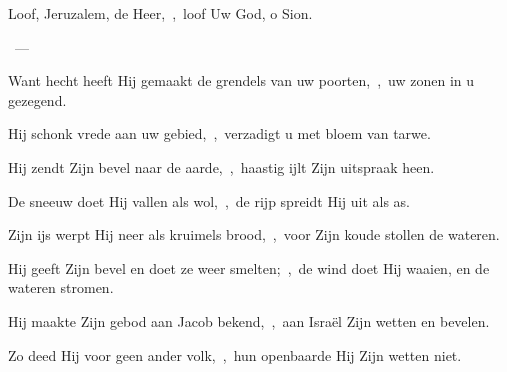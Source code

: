 \documentclass[12pt,twoside,a5paper]{article}
\begin{document}
\begin{halfparskip}
   
\end{halfparskip}

\begin{halfparskip}
   Loof, Jeruzalem, de Heer,~\sep\ loof Uw God, o Sion.

  ~--- 

  Want hecht heeft Hij gemaakt de grendels van uw poorten,~\sep\ uw zonen in u gezegend.

  Hij schonk vrede aan uw gebied,~\sep\ verzadigt u met bloem van tarwe.

  Hij zendt Zijn bevel naar de aarde,~\sep\ haastig ijlt Zijn uitspraak heen.

  De sneeuw doet Hij vallen als wol,~\sep\ de rijp spreidt Hij uit als as.

  Zijn ijs werpt Hij neer als kruimels brood,~\sep\ voor Zijn koude stollen de wateren.

  Hij geeft Zijn bevel en doet ze weer smelten;~\sep\ de wind doet Hij waaien, en de wateren stromen.

  Hij maakte Zijn gebod aan Jacob bekend,~\sep\ aan Israël Zijn wetten en bevelen.

  Zo deed Hij voor geen ander volk,~\sep\ hun openbaarde Hij Zijn wetten niet.
\end{halfparskip}
\end{document}
